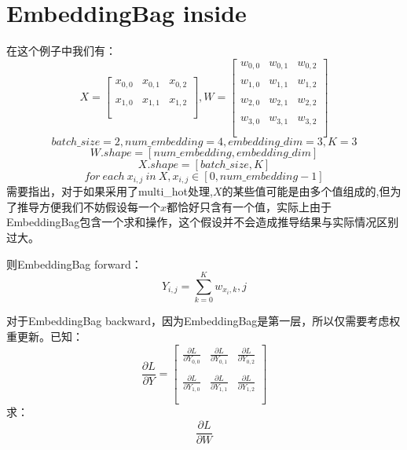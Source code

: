 \documentclass{article}
\begin{document}
\section{EmbeddingBag inside}
在这个例子中我们有：
$$X=
\left[
    \begin{array}{ccc}
        x_{0,0} & x_{0,1} &x_{0,2}\\\\
        x_{1,0} & x_{1,1} &x_{1,2}\\\\
    \end{array}
\right],W=
\left[
    \begin{array}{ccc}
        w_{0,0} & w_{0,1} & w_{0,2}\\\\
        w_{1,0} & w_{1,1} & w_{1,2}\\\\
        w_{2,0} & w_{2,1} & w_{2,2}\\\\
        w_{3,0} & w_{3,1} & w_{3,2}\\\\
    \end{array}
\right]$$
$$batch\_size=2, num\_embedding=4, embedding\_dim=3, K=3$$
$$W.shape=\left[num\_embedding, embedding\_dim\right]$$
$$X.shape=\left[batch\_size, K\right]$$
$$for\ each\ x_{i,j}\ in\ X, x_{i,j} \in [0, num\_embedding-1]$$
需要指出，对于如果采用了multi\_hot处理,$X$的某些值可能是由多个值组成的,但为了推导方便我们不妨假设每一个$x$都恰好只含有一个值，实际上由于EmbeddingBag包含一个求和操作，这个假设并不会造成推导结果与实际情况区别过大。

则EmbeddingBag forward：
$$Y_{i,j}=\sum_{k=0}^K{w_{x_i,k},j}$$

对于EmbeddingBag backward，因为EmbeddingBag是第一层，所以仅需要考虑权重更新。已知：
$$\frac{\partial L}{\partial Y}=
\left[
    \begin{array}{ccc}
        \frac{\partial L}{\partial Y_{0,0}} & \frac{\partial L}{\partial Y_{0,1}} & \frac{\partial L}{\partial Y_{0,2}}\\\\
        \frac{\partial L}{\partial Y_{1,0}} & \frac{\partial L}{\partial Y_{1,1}} & \frac{\partial L}{\partial Y_{1,2}}\\\\
    \end{array}
\right]$$
求：$$\frac{\partial L}{\partial W}$$
\end{document}
